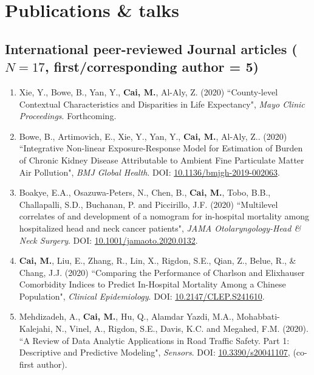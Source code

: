\documentclass[11pt, a4paper]{article}
\newcommand{\years}[1]{\marginnote{\scriptsize #1}}
\begin{document}
	
	

	\section*{Publications \& talks}
	\subsection*{International peer-reviewed Journal articles ($N=17$, first/corresponding author = 5)}
	\begin{enumerate}[leftmargin=0ex,itemsep=1ex]
		\item \years{2020}Xie, Y., Bowe, B., Yan, Y., \textbf{Cai, M.}, Al-Aly, Z. (2020) ``County-level Contextual Characteristics and Disparities in Life Expectancy", \emph{Mayo Clinic Proceedings}. Forthcoming.
		
		\item Bowe, B., Artimovich, E., Xie, Y., Yan, Y., \textbf{Cai, M.}, Al-Aly, Z.. (2020) ``Integrative Non-linear Exposure-Response Model for Estimation of Burden of Chronic Kidney Disease Attributable to Ambient Fine Particulate Matter Air Pollution", \emph{BMJ Global Health}. DOI: \href{https://doi.org/10.1136/bmjgh-2019-002063}{10.1136/bmjgh-2019-002063}.
		
		\item Boakye, E.A., Osazuwa-Peters, N., Chen, B., \textbf{Cai, M.}, Tobo, B.B., Challapalli, S.D., Buchanan, P. and Piccirillo, J.F. (2020) ``Multilevel correlates of and development of a nomogram for in-hospital mortality among hospitalized head and neck cancer patients", \emph{JAMA Otolaryngology-Head \& Neck Surgery}. DOI: \href{https://doi.org/10.1001/jamaoto.2020.0132}{10.1001/jamaoto.2020.0132}.
		
		\item \textbf{Cai, M.}, Liu, E., Zhang, R., Lin, X., Rigdon, S.E., Qian, Z., Belue, R., \& Chang, J.J. (2020) ``Comparing the Performance of Charlson and Elixhauser Comorbidity Indices to Predict In-Hospital Mortality Among a Chinese Population", \emph{Clinical Epidemiology}. DOI: \href{https://doi.org/10.2147/CLEP.S241610}{10.2147/CLEP.S241610}.
		
		\item Mehdizadeh, A., \textbf{Cai, M.}, Hu, Q., Alamdar Yazdi, M.A., Mohabbati-Kalejahi, N., Vinel, A., Rigdon, S.E., Davis, K.C. and Megahed, F.M. (2020). ``A Review of Data Analytic Applications in Road Traffic Safety. Part 1: Descriptive and Predictive Modeling", \emph{Sensors}. DOI: \href{https://doi.org/10.3390/s20041107}{10.3390/s20041107}, (co-first author).
		

\end{enumerate}
\end{document}
